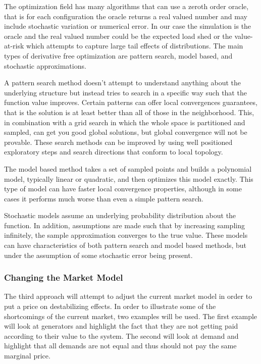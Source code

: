 The optimization field has many algorithms that can use a zeroth order oracle, that is for each configuration the oracle returns a real valued number and may include stochastic variation or numerical error.  In our case the simulation is the oracle and the real valued number could be the expected load shed or the value-at-risk which attempts to capture large tail effects of distributions.  The main types of derivative free optimization are pattern search, model based, and stochastic approximations.  

A pattern search method doesn't attempt to understand anything about the underlying structure but instead tries to search in a specific way such that the function value improves.  Certain patterns can offer local convergences guarantees, that is the solution is at least better than all of those in the neighborhood.  This, in combination with a grid search in which the whole space is partitioned and sampled, can get you good global solutions, but global convergence will not be provable.  These search methods can be improved by using well positioned exploratory steps and search directions that conform to local topology.

  The model based method takes a set of sampled points and builds a polynomial model, typically linear or quadratic, and then optimizes this model exactly.  This type of model can have faster local convergence properties, although in some cases it performs much worse than even a simple pattern search.

Stochastic models assume an underlying probability distribution about the function.  In addition, assumptions are made such that by increasing sampling infinitely, the sample approximation converges to the true value.  These models can have characteristics of both pattern search and model based methods, but under the assumption of some stochastic error being present.

\subsubsection{Changing the Market Model}
The third approach will attempt to adjust the current market model in order to put a price on destabilizing effects.  In order to illustrate some of the shortcomings of the current market, two examples will be used.  The first example will look at generators and highlight the fact that they are not getting paid according to their value to the system.  The second will look at demand and highlight that all demands are not equal and thus should not pay the same marginal price.

